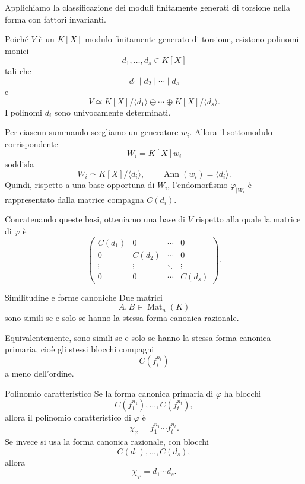 \documentclass[a4paper]{article}
\begin{document}
\begin{radioactive}
\begin{snippetproof}{}
    Applichiamo la classificazione dei moduli finitamente generati di torsione nella forma con fattori invarianti.

    Poiché \(V\) è un \(K[X]\)-modulo finitamente generato di torsione, esistono polinomi monici
    \[
        d_1,\ldots,d_s\in K[X]
    \]
    tali che
    \[
        d_1\mid d_2\mid\cdots\mid d_s
    \]
    e
    \[
        V\simeq
        K[X]/\langle d_1 \rangle
        \oplus\cdots\oplus
        K[X]/\langle d_s \rangle.
    \]
    I polinomi \(d_i\) sono univocamente determinati.

    Per ciascun summando scegliamo un generatore \(w_i\). Allora il sottomodulo corrispondente
    \[
        W_i=K[X]w_i
    \]
    soddisfa
    \[
        W_i\simeq K[X]/\langle d_i \rangle,
        \qquad
        \operatorname{Ann}(w_i)=\langle d_i \rangle.
    \]
    Quindi, rispetto a una base opportuna di \(W_i\), l'endomorfismo \(\varphi_{|W_i}\) è rappresentato dalla matrice compagna \(C(d_i)\).

    Concatenando queste basi, otteniamo una base di \(V\) rispetto alla quale la matrice di \(\varphi\) è
    \[
        \begin{pmatrix}
            C(d_1) & 0 & \cdots & 0\\
            0 & C(d_2) & \cdots & 0\\
            \vdots & \vdots & \ddots & \vdots\\
            0 & 0 & \cdots & C(d_s)
        \end{pmatrix}.
    \]
\end{snippetproof}
\end{radioactive}

\begin{radioactive}
\begin{snippetremark}{Similitudine e forme canoniche}
    Due matrici
    \[
        A,B\in\operatorname{Mat}_n(K)
    \]
    sono simili se e solo se hanno la stessa forma canonica razionale.

    Equivalentemente, sono simili se e solo se hanno la stessa forma canonica primaria, cioè gli stessi blocchi compagni
    \[
        C(f_i^{n_i})
    \]
    a meno dell'ordine.
\end{snippetremark}
\end{radioactive}

\begin{radioactive}
\begin{snippetremark}{Polinomio caratteristico}
    Se la forma canonica primaria di \(\varphi\) ha blocchi
    \[
        C(f_1^{n_1}),\ldots,C(f_t^{n_t}),
    \]
    allora il polinomio caratteristico di \(\varphi\) è
    \[
        \chi_\varphi
        =
        f_1^{n_1}\cdots f_t^{n_t}.
    \]
    Se invece si usa la forma canonica razionale, con blocchi
    \[
        C(d_1),\ldots,C(d_s),
    \]
    allora
    \[
        \chi_\varphi=d_1\cdots d_s.
    \]
\end{snippetremark}
\end{radioactive}
\end{document}
